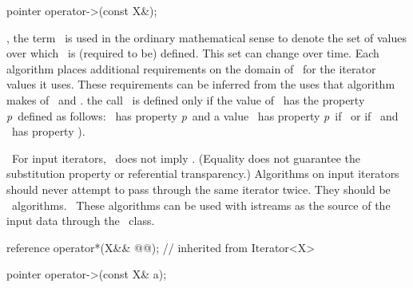 \documentclass[american,twoside]{book}
\newcommand{\resetcolor}{\textcolor{addclr}{}}
\begin{document}
\begin{paras}
\begin{codeblock}
{  pointer operator->(const X&);
}
\end{codeblock}
\color{black}

\pnum
{}, the term
\
is used in the ordinary mathematical sense to denote
the set of values over which
\tcode{==}\ is (required to be) defined.
This set can change over time.
Each algorithm places additional requirements on the domain of
\tcode{==}\ for the iterator values it uses.
These requirements can be inferred from the uses that algorithm
makes of \tcode{==}\ and \tcode{!=}.
\enterexample
the call \
is defined only if the value of \
has the property \textit{p}\
defined as follows:
\tcode{b}\ has property \textit{p}\
and a value \
has property \textit{p}\
if
\tcode{(*i==x)}\
or if
\tcode{(*i!=x}\
and
\tcode{++i}\
has property
\tcode{p}).
\exitexample\


\pnum
\enternote\ 
For input iterators,
\
does not imply
.
(Equality does not guarantee the substitution property or referential transparency.)
Algorithms on input iterators should never attempt to pass through the same iterator twice.
\resetcolor{}They should be
\ 
algorithms.
\
These algorithms can be used with istreams as the source of the input data through the
\
class.
\exitnote\ 

\color{addclr}
\begin{itemdecl}
reference operator*(X&& @@); // inherited from Iterator<X>
\end{itemdecl}

\pnum
{}

\pnum
{}

\begin{itemdecl}
pointer operator->(const X& a);
\end{itemdecl}

\pnum
{}


\end{paras}
\end{document}

